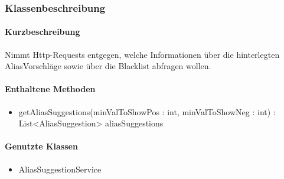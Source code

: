 \subsubsection*{Klassenbeschreibung}%
\paragraph*{Kurzbeschreibung}
Nimmt Http-Requests entgegen, welche Informationen über die hinterlegten AliasVorschläge sowie über die Blacklist abfragen wollen.
\paragraph*{Enthaltene Methoden}
\begin{itemize}
    \item getAliasSuggestions(minValToShowPos : int, minValToShowNeg : int) : List<AliasSuggestion> aliasSuggestions
\end{itemize}
\paragraph*{Genutzte Klassen}
\begin{itemize}
    \item AliasSuggestionService
\end{itemize}
